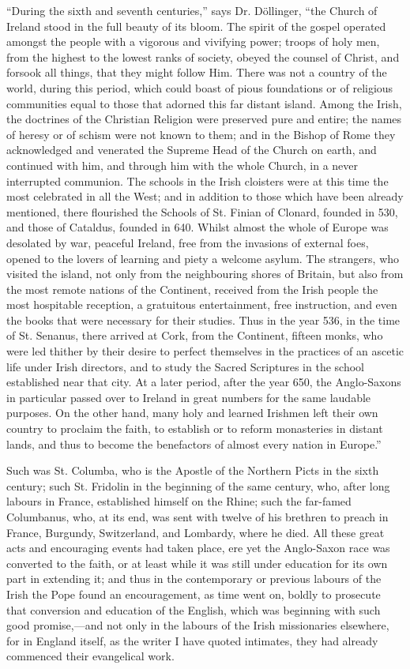 ``During the sixth and seventh centuries,'' says Dr. Döllinger, ``the Church of Ireland stood in the full beauty of
its bloom. The spirit of the gospel operated amongst the people with a
vigorous and vivifying power; troops of holy men, from the highest to
the lowest ranks of society, obeyed the counsel of Christ, and forsook
all things, that they might follow Him. There was not a country of the
world, during this period, which could boast of pious foundations or
of religious communities equal to those that adorned this far distant
island. Among the Irish, the doctrines of the Christian Religion were
preserved pure and entire; the names of heresy or of schism were not
known to them; and in the Bishop of Rome they acknowledged and
venerated the Supreme Head of the Church on earth, and continued with
him, and through him with the whole Church, in a never interrupted
communion. The schools in the Irish cloisters were at this time the
most celebrated in all the West; and in addition to those which have
been already mentioned, there flourished the Schools of St. Finian of
Clonard, founded in 530, and those of Cataldus, founded in 640. Whilst
almost the whole of Europe was desolated by war, peaceful Ireland,
free from the invasions of external foes, opened to the lovers of
learning and piety a welcome asylum. The strangers, who visited the
island, not only from the neighbouring shores of Britain, but also
from the most remote nations of the Continent, received from the Irish
people the most hospitable reception, a gratuitous entertainment, free
instruction, and even the books that were necessary for their studies.
Thus in the year 536, in the time of St. Senanus, there arrived at
Cork, from the Continent, fifteen monks, who were led thither by their
desire to perfect themselves in the practices of an ascetic life under Irish directors, and to study the Sacred Scriptures in the
school established near that city. At a later period, after the year
650, the Anglo-Saxons in particular passed over to Ireland in great
numbers for the same laudable purposes. On the other hand, many holy
and learned Irishmen left their own country to proclaim the faith, to
establish or to reform monasteries in distant lands, and thus to
become the benefactors of almost every nation in Europe.''

Such was St. Columba, who is the Apostle of the Northern Picts in
the sixth century; such St. Fridolin in the beginning of the same
century, who, after long labours in France, established himself on the
Rhine; such the far-famed Columbanus, who, at its end, was sent with
twelve of his brethren to preach in France, Burgundy, Switzerland, and
Lombardy, where he died. All these great acts and encouraging events
had taken place, ere yet the Anglo-Saxon race was converted to the
faith, or at least while it was still under education for its own part
in extending it; and thus in the contemporary or previous labours of
the Irish the Pope found an encouragement, as time went on, boldly to
prosecute that conversion and education of the English, which was
beginning with such good promise,—and not only in the labours of the
Irish missionaries elsewhere, for in England itself, as the writer I
have quoted intimates, they had already commenced their evangelical
work.

